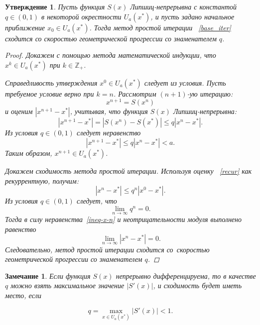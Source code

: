 \documentclass[11pt,a4paper,twoside,listtotoc,bibtotoc]{report}
\numberwithin{equation}{section}
\newtheorem*{statement}{Утверждение}
\theoremstyle{definition}
\theoremstyle{plain}
\newtheorem*{note*}{Замечание}
\begin{document}
\begin{statement}
%
    Пусть функция $S(x)$ Липшиц-непрерывна с константой $q \in (0,1)$ в некоторой
    окрестности $U_a(x^*)$, и пусть
    задано начальное приближение $x_0\in U_a(x^*)$. Тогда метод простой итерации
   ~\eqref{base_iter} сходится со скоростью геометрической прогрессии со
    знаменателем $q$.
    \begin{proof}
        Докажем с помощью метода математической индукции, что
        $x^k \in U_a(x^*)$ при $k \in \mathbb{Z}_+$.

        Справедливость утверждения $x^0 \in U_a(x^*)$ следует из условия.
        Пусть требуемое условие верно при $k=n$. Рассмотрим $(n+1)$-ую итерацию:
        $$
            x^{n+1} = S(x^n)
        $$
        и оценим $|x^{n+1} - x^*|$, учитывая, что функция $S(x)$
        Липшиц-непрерывна:
        \begin{equation}
            \label{recur}
            |x^{n+1} - x^*| = |S(x^n) - S(x^*)| \leqslant q|x^n - x^*|.
        \end{equation}
        Из условия $q \in (0,1)$ следует неравенство
        $$
            |x^{n+1} - x^*| \leqslant q|x^n - x^*| < a.
        $$
        Таким образом, $x^{n+1} \in U_a(x^*)$.

        Докажем сходимость метода простой итерации. Используя оценку
       ~\eqref{recur} как рекуррентную, получим:
        \begin{equation}
            \label{ineq-x-n}
            |x^n - x^*| \leqslant q^n|x^0 - x^*|.
        \end{equation}
        Из условия $q \in (0,1)$ следует, что
        $$
            \lim_{n\rightarrow \infty}q^n = 0.
        $$
        Тогда в силу неравенства~\eqref{ineq-x-n} и неотрицательности модуля
        выполнено равенство
        $$
            \lim_{n\rightarrow \infty}\left|x^n - x^*\right| = 0.
        $$
        Следовательно, метод простой итерации сходится со~скоростью
        геометрической прогрессии со знаменателем $q$.
    \end{proof}
%
\end{statement}
%
%
\begin{note*}
%
    Если функция $S(x)$ непрерывно дифференцируема, то в качестве $q$ можно
    взять максимальное значение $\left|S'(x)\right|$, и сходимость будет иметь место, если

    $$
        q = \max_{x \in U_a(x^*)} \left|S'(x)\right| < 1.
    $$
%
\end{note*}
%
\end{document}
